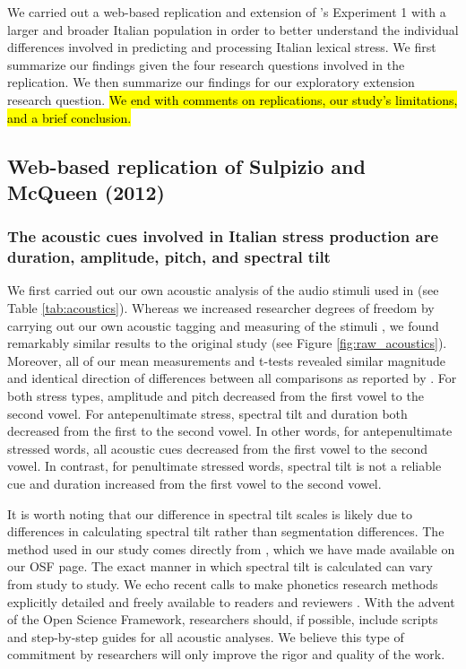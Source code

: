 We carried out a web-based replication and extension of \cite{Sulpizio_McQueen_2012}'s Experiment 1 with a larger and broader Italian population in order to better understand the individual differences involved in predicting and processing Italian lexical stress. We first summarize our findings given the four research questions involved in the replication. We then summarize our findings for our exploratory extension research question. \hl{We end with comments on replications, our study's limitations, and a brief conclusion.}

\subsection{Web-based replication of Sulpizio and McQueen (2012)}
\subsubsection{The acoustic cues involved in Italian stress production are duration, amplitude, pitch, and spectral tilt}
We first carried out our own acoustic analysis of the audio stimuli used in \cite{Sulpizio_McQueen_2012} (see Table \ref{tab:acoustics}). Whereas we increased researcher degrees of freedom by carrying out our own acoustic tagging and measuring of the stimuli \citep{Corretta2023, roettger2019researcher}, we found remarkably similar results to the original study (see Figure \ref{fig:raw_acoustics}). Moreover, all of our mean measurements and t-tests revealed similar magnitude and identical direction of differences between all comparisons as reported by \cite{Sulpizio_McQueen_2012}. For both stress types, amplitude and pitch decreased from the first vowel to the second vowel. For antepenultimate stress, spectral tilt and duration both decreased from the first to the second vowel. In other words, for antepenultimate stressed words, all acoustic cues decreased from the first vowel to the second vowel. In contrast, for penultimate stressed words, spectral tilt is not a reliable cue and duration increased from the first vowel to the second vowel.

It is worth noting that our difference in spectral tilt scales is likely due to differences in calculating spectral tilt rather than segmentation differences. The method used in our study comes directly from \cite{sluijter1996spectral,cutler2007dutch}, which we have made available on our OSF page. The exact manner in which spectral tilt is calculated can vary from study to study. We echo recent calls to make phonetics research methods explicitly detailed and freely available to readers and reviewers \citep{roettger2019emergent, roettger2019researcher}. With the advent of the Open Science Framework, researchers should, if possible, include scripts and step-by-step guides for all acoustic analyses. We believe this type of commitment by researchers will only improve the rigor and quality of the work.

